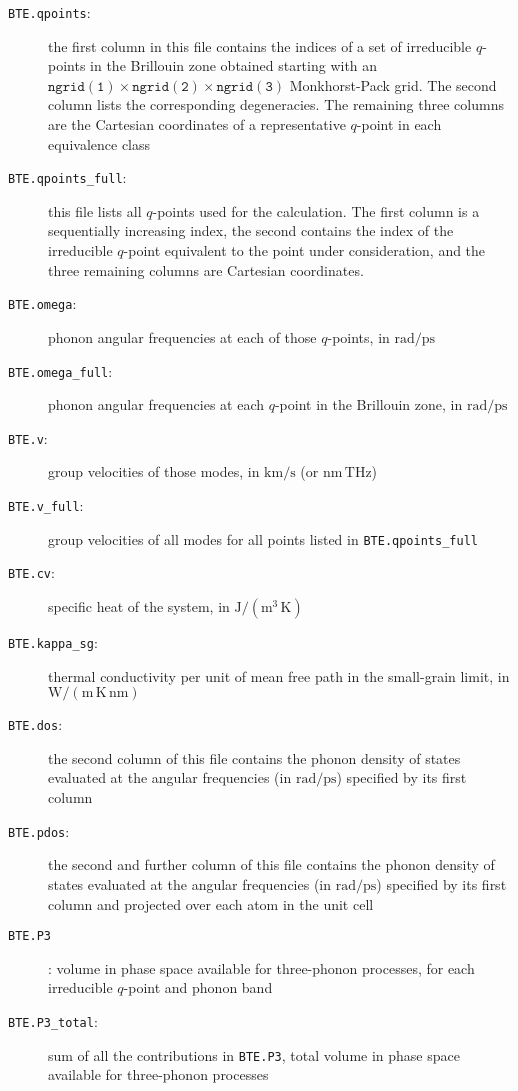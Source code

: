 \documentclass[a4paper,10pt,english]{article}
\begin{document}
\begin{description}
\item[\texttt{BTE.qpoints}:] the first column in this file contains the indices of a set of irreducible $q$-points in the Brillouin zone obtained starting with an $\mathtt{ngrid\left(1\right)}\times\mathtt{ngrid\left(2\right)}\times\mathtt{ngrid\left(3\right)}$ Monkhorst-Pack grid. The second column lists the corresponding degeneracies. The remaining three columns are the Cartesian coordinates of a representative $q$-point in each equivalence class
\item[\texttt{BTE.qpoints\_full}:] this file lists all $q$-points used for the calculation. The first column is a sequentially increasing index, the second contains the index of the irreducible $q$-point equivalent to the point under consideration, and the three remaining columns are Cartesian coordinates.
\item[\texttt{BTE.omega}:] phonon angular frequencies at each of those $q$-points, in $\mathrm{rad/ps}$
\item[\texttt{BTE.omega\_full}:] phonon angular frequencies at each $q$-point in the Brillouin zone, in $\mathrm{rad/ps}$
\item[\texttt{BTE.v}:] group velocities of those modes, in $\mathrm{km/s}$ (or $\mathrm{nm}\,\mathrm{THz}$)
\item[\texttt{BTE.v\_full}:] group velocities of all modes for all points listed in \texttt{BTE.qpoints\_full}
\item[\texttt{BTE.cv}:] specific heat of the system, in $\mathrm{J/\left(m^3\,K\right)}$
\item[\texttt{BTE.kappa\_sg}:] thermal conductivity per unit of mean free path in the small-grain limit, in $\mathrm{W/\left(m\,K\,nm\right)}$
\item[\texttt{BTE.dos}:] the second column of this file contains the phonon density of states evaluated at the angular frequencies (in $\mathrm{rad/ps}$) specified by its first column
\item[\texttt{BTE.pdos}:] the second and further column of this file contains the phonon density of states evaluated at the angular frequencies (in $\mathrm{rad/ps}$) specified by its first column and projected over each atom in the unit cell
\item[\texttt{BTE.P3}]: volume in phase space available for three-phonon processes, for each irreducible $q$-point and phonon band
\item[\texttt{BTE.P3\_total}:] sum of all the contributions in \texttt{BTE.P3}, total volume in phase space available for three-phonon processes

\end{description}
\end{document}
